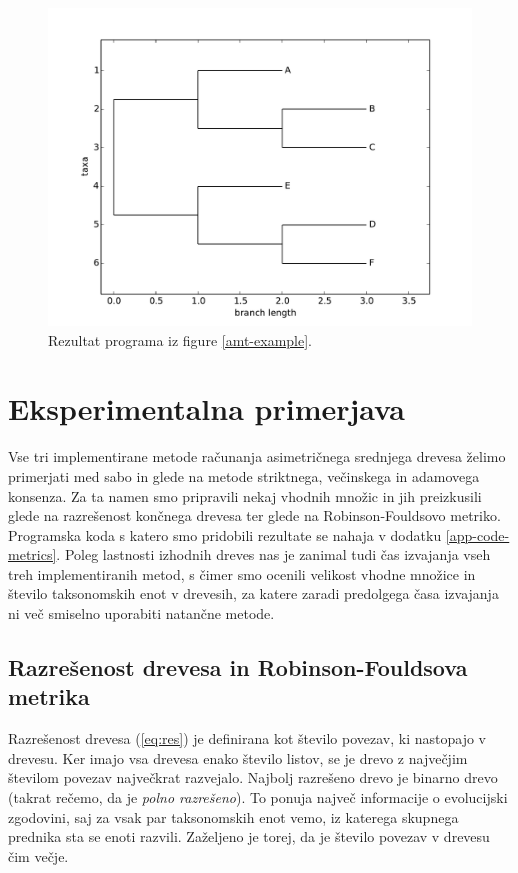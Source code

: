 \documentclass[a4paper, 12pt]{book}
\begin{document}
\begin{figure}[h!]
	\begin{center}
		\includegraphics[scale=0.65, clip=true, trim=1cm 0 1cm 1cm]{gfx/ex_b.pdf}
	\end{center}
	\caption{Rezultat programa iz figure \ref{amt-example}.}
	\label{img-example-output}
\end{figure}

\chapter{Eksperimentalna primerjava}

Vse tri implementirane metode računanja asimetričnega srednjega drevesa želimo primerjati med sabo in glede na metode striktnega, večinskega in adamovega konsenza. Za ta namen smo pripravili nekaj vhodnih množic in jih preizkusili glede na razrešenost končnega drevesa ter glede na Robinson-Fouldsovo metriko. Programska koda s katero smo pridobili rezultate se nahaja v dodatku \ref{app-code-metrics}. Poleg lastnosti izhodnih dreves nas je zanimal tudi čas izvajanja vseh treh implementiranih metod, s čimer smo ocenili velikost vhodne množice in število taksonomskih enot v drevesih, za katere zaradi predolgega časa izvajanja ni več smiselno uporabiti  natančne metode. 

\section{Razrešenost drevesa in Robinson-Fouldsova metrika}
Razrešenost drevesa (\ref{eq:res}) je definirana kot število povezav, ki nastopajo v drevesu. Ker imajo vsa drevesa enako število listov, se je drevo z največjim številom povezav največkrat razvejalo. Najbolj razrešeno drevo je binarno drevo (takrat rečemo, da je {\it polno razrešeno}). To ponuja največ informacije o evolucijski zgodovini, saj za vsak par taksonomskih enot vemo, iz katerega skupnega prednika sta se enoti razvili. Zaželjeno je torej, da je število povezav v drevesu čim večje.
\end{document}
